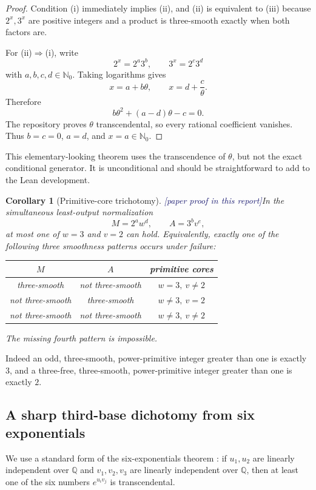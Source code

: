 \documentclass[11pt,oneside]{article}
\newtheorem{corollary}[theorem]{Corollary}
\theoremstyle{definition}
\newcommand{\Nzero}{\mathbb N_0}
\newcommand{\Q}{\mathbb Q}
\newcommand{\tagPaper}{\textcolor{MidnightBlue}{\textsf{[paper proof in this report]}}}
\begin{document}
\begin{proof}
Condition (i) immediately implies (ii), and (ii) is equivalent to (iii) because
\(2^x,3^x\) are positive integers and a product is three-smooth exactly when both factors
are.

For (ii)\(\Rightarrow\)(i), write
\[
  2^x=2^a3^b,
  \qquad
  3^x=2^c3^d
\]
with \(a,b,c,d\in\Nzero\).  Taking logarithms gives
\[
  x=a+b\theta,
  \qquad
  x=d+\frac c\theta.
\]
Therefore
\[
  b\theta^2+(a-d)\theta-c=0.
\]
The repository proves \(\theta\) transcendental, so every rational coefficient vanishes.
Thus \(b=c=0\), \(a=d\), and \(x=a\in\Nzero\).
\end{proof}

This elementary-looking theorem uses the transcendence of \(\theta\), but not the exact
conditional generator.  It is unconditional and should be straightforward to add to the
Lean development.

\begin{corollary}[Primitive-core trichotomy]\label{cor:core-trichotomy}
\tagPaper In the simultaneous least-output normalization
\[
  M=2^aw^d,
  \qquad A=3^bv^e,
\]
at most one of \(w=3\) and \(v=2\) can hold.  Equivalently, exactly one of the following
three smoothness patterns occurs under failure:
\begin{center}
\begin{tabular}{@{}ccc@{}}
\toprule
\(M\) & \(A\) & primitive cores\\
\midrule
three-smooth & not three-smooth & \(w=3,\ v\ne2\)\\
not three-smooth & three-smooth & \(w\ne3,\ v=2\)\\
not three-smooth & not three-smooth & \(w\ne3,\ v\ne2\)\\
\bottomrule
\end{tabular}
\end{center}
The missing fourth pattern is impossible.
\end{corollary}

Indeed an odd, three-smooth, power-primitive integer greater than one is exactly \(3\), and
a three-free, three-smooth, power-primitive integer greater than one is exactly \(2\).

\subsection{A sharp third-base dichotomy from six exponentials}

We use a standard form of the six-exponentials theorem
\cite{Ramachandra1968II,Waldschmidt2000}: if \(u_1,u_2\) are linearly independent over
\(\Q\) and \(v_1,v_2,v_3\) are linearly independent over \(\Q\), then at least one of
the six numbers \(e^{u_iv_j}\) is transcendental.
\end{document}

